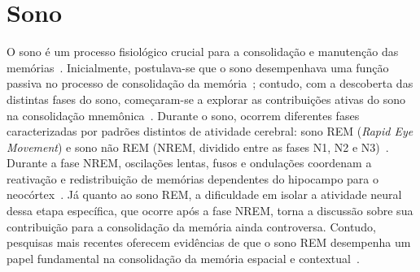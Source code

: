 \section{Sono}

O sono é um processo fisiológico crucial para a consolidação e manutenção das memórias~\cite{blissittSleep2001, walkerSleep2006, diekelmannMemory2010}.
Inicialmente, postulava-se que o sono desempenhava uma
função passiva no processo de consolidação da memória~\cite{jenkinsObliviscence1924}; contudo, com a descoberta das distintas
fases do sono, começaram-se a explorar as contribuições ativas do sono na consolidação mnemônica~\cite{aserinskyRegularly1953}.
Durante o sono, ocorrem diferentes fases caracterizadas por padrões distintos de atividade cerebral: sono REM (\textit{Rapid Eye
Movement}) e sono não REM (NREM, dividido entre as fases N1, N2 e N3)~\cite{schulzRethinking2008}. Durante a fase NREM, oscilações
lentas, fusos e ondulações coordenam a reativação e redistribuição de memórias dependentes do hipocampo para o
neocórtex~\cite{diekelmannMemory2010}. Já quanto ao sono REM, a dificuldade em isolar a atividade neural dessa etapa específica,
que ocorre após a fase NREM, torna a discussão sobre sua contribuição para a consolidação da memória ainda controversa. Contudo,
pesquisas mais recentes oferecem evidências de que o sono REM desempenha um papel fundamental na consolidação da memória espacial
e contextual~\cite{boyceREM2017}.